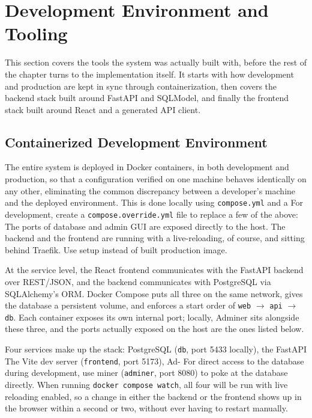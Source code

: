 \documentclass[a4paper, 12pt, oneside, openany, BCOR1cm,toc=chapterentrywithdots]{scrbook}
\begin{document}
\section{Development Environment and Tooling}

This section covers the tools the system was actually built with, before the rest of the chapter
turns to the implementation itself. It starts with how development and production are kept in
sync through containerization, then covers the backend stack built around FastAPI and SQLModel,
and finally the frontend stack built around React and a generated API client.

\subsection{Containerized Development Environment}

The entire system is deployed in Docker containers, in both development and production, so that
a configuration verified on one machine behaves identically on any other, eliminating the common
discrepancy between a developer's machine and the deployed environment. This is done locally
using \texttt{compose.yml} and a For development, create a \texttt{compose.override.yml} file to
replace a few of the above: The ports of database and admin GUI are exposed directly to the
host. The backend and the frontend are running with a live-reloading, of course, and sitting
behind Traefik. Use setup instead of built production image.

At the service level, the React frontend communicates with the FastAPI backend over REST/JSON,
and the backend communicates with PostgreSQL via SQLAlchemy's ORM. Docker Compose puts all three
on the same network, gives the database a persistent volume, and enforces a start order of
\texttt{web} $\to$ \texttt{api} $\to$ \texttt{db}. Each container exposes its own internal port;
locally, Adminer sits alongside these three, and the ports actually exposed on the host are the
ones listed below.

Four services make up the stack: PostgreSQL (\texttt{db}, port 5433 locally), the FastAPI The
Vite dev server (\texttt{frontend}, port 5173), Ad- For direct access to the database during
development, use miner (\texttt{adminer}, port 8080) to poke at the database directly. When
running \texttt{docker compose watch}, all four will be run with live reloading enabled, so a
change in either the backend or the frontend shows up in the browser within a second or two,
without ever having to restart manually.
\end{document}
